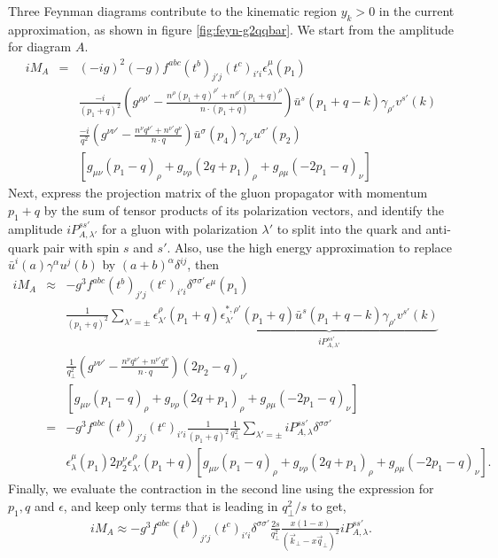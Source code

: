 \begin{appendices}
Three Feynman diagrams contribute to the kinematic region $y_k >0$ in the current approximation, as shown in figure \ref{fig:feyn-g2qqbar}.
We start from the amplitude for diagram $A$.
\begin{eqnarray}
i M_A &=& (-ig)^2(-g)f^{abc}(t^b)_{j'j}(t^c)_{i'i} \epsilon_\lambda^\mu(p_1) \\\nonumber
&&\frac{-i}{(p_1+q)^2}\left(g^{\rho\rho'}-\frac{n^{\rho}(p_1+q)^{\rho'}+n^{\rho'}(p_1+q)^\rho}{n\cdot (p_1+q)}\right) \bar{u}^s(p_1+q-k)\gamma_{\rho'}v^{s'}(k) \\ \nonumber
&&\frac{-i}{q^2}\left(g^{\nu\nu'}-\frac{n^{\nu}q^{\nu'}+n^{\nu'}q^\nu}{n\cdot q}\right) \bar{u}^{\sigma}(p_4)\gamma_{\nu'}u^{\sigma'}(p_2) \\ \nonumber
&& \left[g_{\mu\nu}(p_1-q)_\rho + g_{\nu\rho}(2q+p_1)_\rho + g_{\rho\mu}(-2p_1 -q)_\nu \right]
\end{eqnarray}
Next, express the projection matrix of the gluon propagator with momentum $p_1+q$ by the sum of tensor products of its polarization vectors, and identify the amplitude $iP_{A,\lambda'}^{ss'}$ for a gluon with polarization $\lambda'$ to split into the quark and anti-quark pair with spin $s$ and $s'$.
Also, use the high energy approximation to replace $\bar{u}^i(a)\gamma^\alpha u^j(b)$ by $(a+b)^\alpha \delta^{ij}$, then
\begin{eqnarray}
i M_A &\approx& -g^3 f^{abc}(t^b)_{j'j}(t^c)_{i'i} \delta^{\sigma\sigma'} \epsilon^\mu(p_1) \\\nonumber
&&\frac{1}{(p_1+q)^2} \sum_{\lambda'=\pm}\epsilon_{\lambda'}^{\rho}(p_1+q)\underbrace{\epsilon_{\lambda'}^{*,\rho'}(p_1+q) \bar{u}^s(p_1+q-k)\gamma_{\rho'}v^{s'}(k)}_{iP_{A,\lambda'}^{ss'}} \\ \nonumber
&&\frac{1}{q_\perp^2}\left(g^{\nu\nu'}-\frac{n^{\nu}q^{\nu'}+n^{\nu'}q^\nu}{n\cdot q}\right) (2p_2-q)_{\nu'} \\ \nonumber
&& \left[g_{\mu\nu}(p_1-q)_\rho + g_{\nu\rho}(2q+p_1)_\rho + g_{\rho\mu}(-2p_1 -q)_\nu \right] \\
&=& -g^3 f^{abc}(t^b)_{j'j}(t^c)_{i'i} \frac{1}{(p_1+q)^2}\frac{1}{q_\perp^2} \sum_{\lambda'=\pm}iP_{A,\lambda}^{ss'} \delta^{\sigma\sigma'}  \\ \nonumber
&& \epsilon_\lambda^\mu(p_1)2p_2^{\nu} \epsilon_{\lambda'}^{\rho}(p_1+q) \left[g_{\mu\nu}(p_1-q)_\rho + g_{\nu\rho}(2q+p_1)_\rho + g_{\rho\mu}(-2p_1 -q)_\nu \right].
\end{eqnarray}
Finally, we evaluate the contraction in the second line using the expression for $p_1, q$ and $\epsilon$, and keep only terms that is leading in $q_\perp^2/s$ to get,
\begin{eqnarray}
i M_A \approx -g^3 f^{abc}(t^b)_{j'j}(t^c)_{i'i}\delta^{\sigma\sigma'}\frac{2s}{q_\perp^2} \frac{x(1-x)}{(\vec{k}_\perp-x \vec{q}_\perp)^2} iP_{A,\lambda}^{ss'}.
\end{eqnarray}


\end{appendices}
